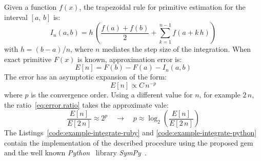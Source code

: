 Given a function $f(x)$, the trapezoidal rule for primitive estimation for the interval $[a,\,b]$ is:
\begin{equation}
  I_{n}(a, b) = h\, \left( \dfrac{f(a) + f(b)}{2} +
    \sum\limits_{k = 1}^{n - 1}{f \left( a + k \,h \right)} \right)
\end{equation}
with $h = (b - a) / n $, where $n$ mediates the step size of the integration. When exact primitive $F(x)$ is known, approximation error is:
\begin{equation}
  E[n] = F(b) - F(a) - I_{n}(a, b)
\end{equation}
The error has an asymptotic expansion of the form:
\begin{equation}
  E[n] \propto C\,{n}^{-p}
\end{equation}
where $p$ is the convergence order. Using a different value for $n$, for example $2\,n$, the ratio~\ref{eq:error.ratio} takes the approximate vale:
\begin{equation}
  \label{eq:error.ratio}
  \dfrac{E[n]}{E[2\,n]} \approx 2^{p} \quad \rightarrow \quad p \approx \log_2 \left( \dfrac{E[n]}{E[2\,n]} \right)
\end{equation}
The Listings~\ref{code:example-integrate-ruby} and \ref{code:example-integrate-python} contain the implementation of the described procedure using the proposed gem and the well known \emph{Python}~\cite{van2011python} library \emph{SymPy}~\cite{christopher_smith_2016_47274}.

\noindent%
\begin{minipage}{.5\textwidth}

\end{minipage}\hfill
\begin{minipage}{.5\textwidth}

\end{minipage}

